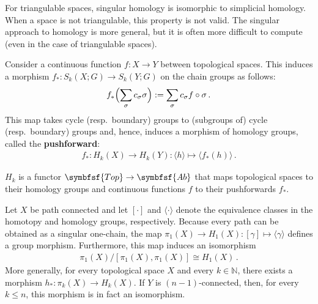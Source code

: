     \begin{property}
        For triangulable spaces, singular homology is isomorphic to simplicial homology. When a space is not triangulable, this property is not valid. The singular approach to homology is more general, but it is often more difficult to compute (even in the case of triangulable spaces).
    \end{property}

    \begin{property}\label{topology:pushforward}
        Consider a continuous function $f:X\rightarrow Y$ between topological spaces. This induces a morphism $f_*:S_k(X;G)\rightarrow S_k(Y;G)$ on the chain groups as follows:
        \begin{gather}
            f_*\Bigl(\sum_\sigma c_\sigma\sigma\Bigr) := \sum_\sigma c_\sigma f\circ\sigma\,.
        \end{gather}
        This map takes cycle (resp.~boundary) groups to (subgroups of) cycle (resp.~boundary) groups and, hence, induces a morphism of homology groups, called the \textbf{pushforward}:
        \begin{gather}
            f_\ast:H_k(X)\rightarrow H_k(Y):\langle h \rangle\mapsto\langle f_*(h)\rangle\,.
        \end{gather}
    \end{property}
    \begin{result}
        $H_k$ is a functor $\symbfsf{Top}\rightarrow\symbfsf{Ab}$ that maps topological spaces to their homology groups and continuous functions $f$ to their pushforwards $f_\ast$.
    \end{result}

    \begin{theorem}[Hurewicz]
        Let $X$ be path connected and let $[\cdot]$ and $\langle\cdot\rangle$ denote the equivalence classes in the homotopy and homology groups, respectively. Because every path can be obtained as a singular one-chain, the map $\pi_1(X)\rightarrow H_1(X):[\gamma]\mapsto\langle\gamma\rangle$ defines a group morphism. Furthermore, this map induces an isomorphism 
        \begin{gather}
            \pi_1(X)/[\pi_1(X),\pi_1(X)] \cong H_1(X)\,.
        \end{gather}
        More generally, for every topological space $X$ and every $k\in\mathbb{N}$, there exists a morphism $h_*:\pi_k(X)\rightarrow H_k(X)$. If $Y$ is $(n-1)$-connected, then, for every $k\leq n$, this morphism is in fact an isomorphism.
    \end{theorem}

